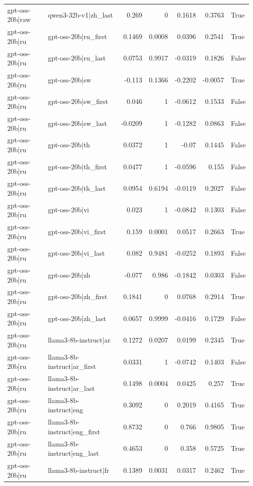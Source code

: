 \begin{table}
\begin{tabular}{l l r r r r l}
gpt-oss-20b|raw & qwen3-32b-v1|zh_last & 0.269 & 0 & 0.1618 & 0.3763 & True \\
gpt-oss-20b|ru & gpt-oss-20b|ru_first & 0.1469 & 0.0008 & 0.0396 & 0.2541 & True \\
gpt-oss-20b|ru & gpt-oss-20b|ru_last & 0.0753 & 0.9917 & -0.0319 & 0.1826 & False \\
gpt-oss-20b|ru & gpt-oss-20b|sw & -0.113 & 0.1366 & -0.2202 & -0.0057 & True \\
gpt-oss-20b|ru & gpt-oss-20b|sw_first & 0.046 & 1 & -0.0612 & 0.1533 & False \\
gpt-oss-20b|ru & gpt-oss-20b|sw_last & -0.0209 & 1 & -0.1282 & 0.0863 & False \\
gpt-oss-20b|ru & gpt-oss-20b|th & 0.0372 & 1 & -0.07 & 0.1445 & False \\
gpt-oss-20b|ru & gpt-oss-20b|th_first & 0.0477 & 1 & -0.0596 & 0.155 & False \\
gpt-oss-20b|ru & gpt-oss-20b|th_last & 0.0954 & 0.6194 & -0.0119 & 0.2027 & False \\
gpt-oss-20b|ru & gpt-oss-20b|vi & 0.023 & 1 & -0.0842 & 0.1303 & False \\
gpt-oss-20b|ru & gpt-oss-20b|vi_first & 0.159 & 0.0001 & 0.0517 & 0.2663 & True \\
gpt-oss-20b|ru & gpt-oss-20b|vi_last & 0.082 & 0.9481 & -0.0252 & 0.1893 & False \\
gpt-oss-20b|ru & gpt-oss-20b|zh & -0.077 & 0.986 & -0.1842 & 0.0303 & False \\
gpt-oss-20b|ru & gpt-oss-20b|zh_first & 0.1841 & 0 & 0.0768 & 0.2914 & True \\
gpt-oss-20b|ru & gpt-oss-20b|zh_last & 0.0657 & 0.9999 & -0.0416 & 0.1729 & False \\
gpt-oss-20b|ru & llama3-8b-instruct|ar & 0.1272 & 0.0207 & 0.0199 & 0.2345 & True \\
gpt-oss-20b|ru & llama3-8b-instruct|ar_first & 0.0331 & 1 & -0.0742 & 0.1403 & False \\
gpt-oss-20b|ru & llama3-8b-instruct|ar_last & 0.1498 & 0.0004 & 0.0425 & 0.257 & True \\
gpt-oss-20b|ru & llama3-8b-instruct|eng & 0.3092 & 0 & 0.2019 & 0.4165 & True \\
gpt-oss-20b|ru & llama3-8b-instruct|eng_first & 0.8732 & 0 & 0.766 & 0.9805 & True \\
gpt-oss-20b|ru & llama3-8b-instruct|eng_last & 0.4653 & 0 & 0.358 & 0.5725 & True \\
gpt-oss-20b|ru & llama3-8b-instruct|fr & 0.1389 & 0.0031 & 0.0317 & 0.2462 & True \\

\end{tabular}
\end{table}
